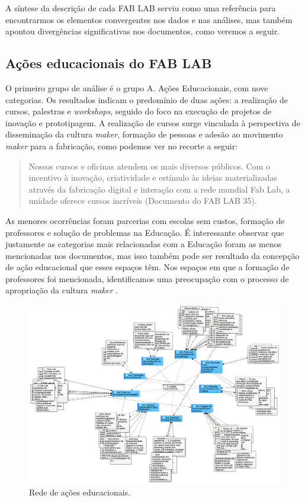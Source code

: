 \documentclass[portuguese]{textolivre}
\begin{document}
A síntese da descrição de cada FAB LAB serviu como uma referência para encontrarmos os elementos convergentes nos dados e nas análises, mas também apontou divergências significativas nos documentos, como veremos a seguir.

\subsection{Ações educacionais do FAB LAB}\label{sec-formato}
O primeiro grupo de análise é o grupo A. Ações Educacionais, com nove categorias. Os resultados indicam o predomínio de duas ações: a realização de cursos, palestras e \textit{workshops}, seguido do foco na execução de projetos de inovação e prototipagem. A realização de cursos surge vinculada à perspectiva de disseminação da cultura \textit{maker}, formação de pessoas e adesão ao movimento \textit{maker} para a fabricação, como podemos ver no recorte a seguir:

\begin{quote}
    Nossos cursos e oficinas atendem os mais diversos públicos. Com o incentivo à inovação, criatividade e estímulo às ideias materializadas através da fabricação digital e interação com a rede mundial Fab Lab, a unidade oferece cursos incríveis (Documento do FAB LAB 35).
\end{quote}

As menores ocorrências foram parcerias com escolas sem custos, formação de professores e solução de problemas na Educação. É interessante observar que justamente as categorias mais relacionadas com a Educação foram as menos mencionadas nos documentos, mas isso também pode ser resultado da concepção de ação educacional que esses espaços têm. Nos espaços em que a formação de professores foi mencionada, identificamos uma preocupação com o processo de apropriação da cultura \textit{maker} .

\begin{figure}
\centering
\begin{minipage}{\textwidth}
\includegraphics[width=\linewidth]{Fig3.png}
\caption{Rede de ações educacionais.}
\label{fig3}
\end{minipage}
\end{figure}
\end{document}
